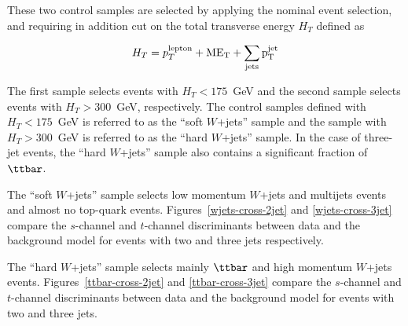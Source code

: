 These two control samples are selected by applying the nominal event
selection, and requiring in addition cut on the total transverse energy $H_{T}$ defined as

\begin{equation}
H_{T} = p^{\rm{lepton}}_{T} + \rm{M}E_{T} + \sum_{\rm{jets}} p^{jet}_{T}
\end{equation}

The first sample selects events with $H_T<175$~GeV and the second sample selects events with $H_T>300$~GeV,
respectively. The control samples defined with $H_{T}<175$~GeV is referred to as the ``soft $W$+jets'' sample and the sample with $H_{T}>300$~GeV is referred to as the ``hard $W$+jets'' sample. In the case of three-jet events, the ``hard $W$+jets'' sample also contains a
significant fraction of $\ttbar$.

The ``soft $W$+jets'' sample selects low momentum $W$+jets and
multijets events and almost no top-quark events.
Figures~\ref{wjets-cross-2jet} and \ref{wjets-cross-3jet} compare the
$s$-channel and $t$-channel discriminants between data and the background model for
events with two and three jets respectively.

The ``hard $W$+jets'' sample selects mainly $\ttbar$ and high momentum
$W$+jets events. Figures~\ref{ttbar-cross-2jet} and
\ref{ttbar-cross-3jet} compare the $s$-channel and $t$-channel discriminants between
data and the background model for events with two and three jets.

